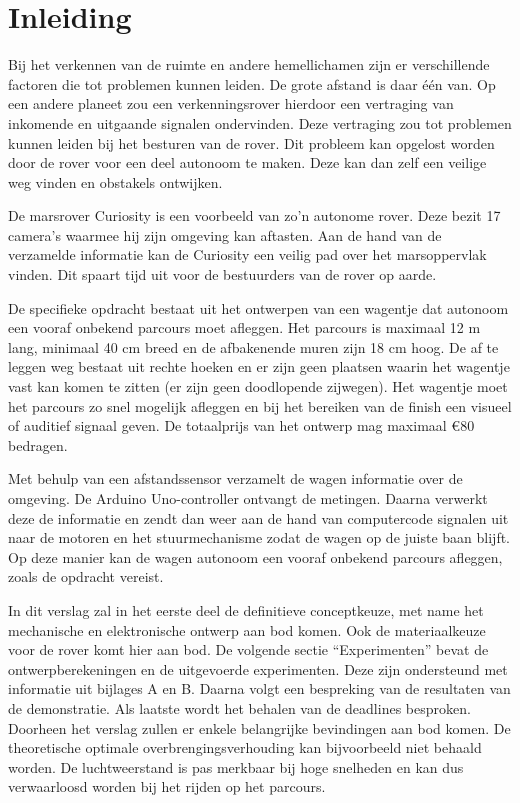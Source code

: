  
\section{Inleiding}
Bij het verkennen van de ruimte en andere hemellichamen zijn er verschillende factoren die tot problemen kunnen leiden. De grote afstand is daar één van. Op een andere planeet zou een verkenningsrover hierdoor een vertraging van inkomende en uitgaande signalen ondervinden. Deze vertraging zou tot problemen kunnen leiden bij het besturen van de rover. Dit probleem kan opgelost worden door de rover voor een deel autonoom te maken. Deze kan dan zelf een veilige weg vinden en obstakels ontwijken.

De marsrover Curiosity is een voorbeeld van zo’n autonome rover. Deze bezit 17 camera's waarmee hij zijn omgeving kan aftasten. Aan de hand van de verzamelde informatie kan de Curiosity een veilig pad over het marsoppervlak vinden. Dit spaart tijd uit voor de bestuurders van de rover op aarde.\cite{NASACuriosity, NASA2013-259} 

De specifieke opdracht bestaat uit het ontwerpen van een wagentje dat autonoom een vooraf onbekend parcours moet afleggen. Het parcours is maximaal 12 m lang, minimaal 40 cm breed en de afbakenende muren zijn 18 cm hoog. De af te leggen weg bestaat uit rechte hoeken en er zijn geen plaatsen waarin het wagentje vast kan komen te zitten (er zijn geen doodlopende zijwegen). Het wagentje moet het parcours zo snel mogelijk afleggen en bij het bereiken van de finish een visueel of auditief signaal geven. De totaalprijs van het ontwerp mag maximaal \euro 80 bedragen.

Met behulp van een afstandssensor verzamelt de wagen informatie over de omgeving. De Arduino Uno-controller ontvangt de metingen. Daarna verwerkt deze  de informatie en zendt dan weer aan de hand van computercode signalen uit naar de motoren en het stuurmechanisme zodat de wagen op de juiste baan blijft. Op deze manier kan de wagen autonoom een vooraf onbekend parcours afleggen, zoals de opdracht vereist.

In dit verslag zal in het eerste deel de definitieve conceptkeuze, met name het mechanische en elektronische ontwerp aan bod komen. Ook de materiaalkeuze voor de rover komt hier aan bod. De volgende sectie “Experimenten” bevat de ontwerpberekeningen en de uitgevoerde experimenten. Deze zijn ondersteund met informatie uit bijlages A en B. Daarna volgt een bespreking van de resultaten van de demonstratie. Als laatste wordt het behalen van de deadlines besproken.
Doorheen het verslag zullen er enkele belangrijke bevindingen aan bod komen. De theoretische optimale overbrengingsverhouding kan bijvoorbeeld niet behaald worden. De luchtweerstand is pas merkbaar bij hoge snelheden en kan dus verwaarloosd worden bij het rijden op het parcours.  
